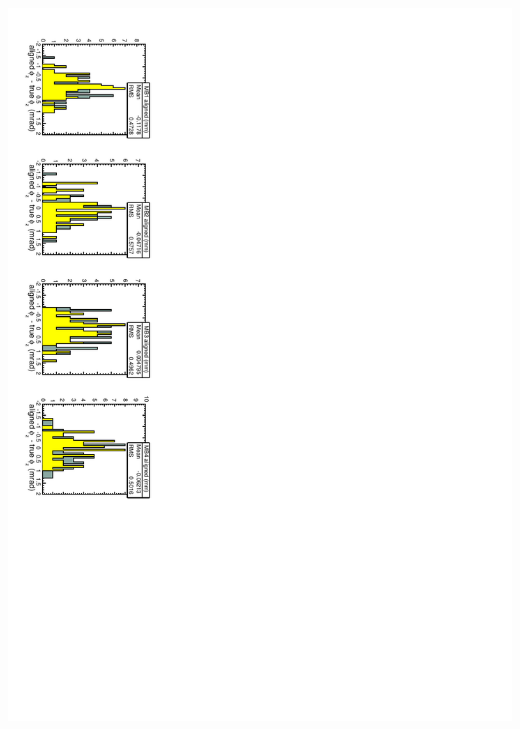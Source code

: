 \documentclass[compress]{beamer}
\begin{document}
\begin{frame}
\includegraphics[height=\linewidth, angle=90]{S43_plots/MillePede_phiz.pdf}

\end{frame}
\end{document}

